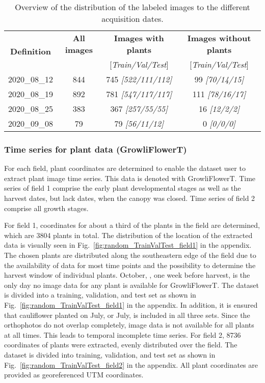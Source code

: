 \documentclass{article}
\def\figref#1{Fig.~\ref{#1}}
\begin{document}
\begin{table}[t]
    \caption{Overview of the distribution of the labeled images to the different acquisition dates.}\label{table:OPTIKOlabeled}
    \begin{center}
    \begin{tabular}{|c|c|c|c|}
        \hline
         \multirow{2}{*}{\textbf{Definition}} &  \textbf{All images} & \textbf{Images with plants} &  \textbf{Images without plants}\\
        &  &  [\textit{Train/Val/Test}]  & [\textit{Train/Val/Test}]\\
        \hline
        2020\_08\_12 & 844 & 745 \textit{[522/111/112]} & 99 \textit{[70/14/15]}\\
        2020\_08\_19 & 892 & 781 \textit{[547/117/117]} & 111 \textit{[78/16/17]}\\
        2020\_08\_25 & 383 & 367 \textit{[257/55/55]} & 16 \textit{[12/2/2]}\\
        2020\_09\_08 & 79 & 79 \textit{[56/11/12]} & 0 \textit{[0/0/0]}\\
        \hline
    \end{tabular}
    \end{center}
\end{table}



\subsubsection{Time series for plant data (GrowliFlowerT)}\label{sec:GrowliFlowerT}

For each field, plant coordinates are determined to enable the dataset user to extract plant image time series.
This data is denoted with GrowliFlowerT. Time series of field 1 comprise the early plant developmental stages as well as the harvest dates, but lack dates, when the canopy was closed. Time series of field 2 comprise all growth stages.

For field 1, coordinates for about a third of the plants in the field are determined, which are 3804 plants in total. The distribution of the location of the extracted data is visually seen in \figref{fig:random_TrainValTest_field1} in the appendix. The chosen plants are distributed along the southeastern edge of the field due to the availability of data for most time points and the possibility to determine the harvest window of individual plants. October, , one week before harvest, is the only day no image data for any plant is available for GrowliFlowerT.
The dataset is divided into a training, validation, and test set as shown in \figref{fig:random_TrainValTest_field1} in the appendix. In addition, it is ensured that cauliflower planted on July,  or July,  is included in all three sets.
Since the orthophotos do not overlap completely, image data is not available for all plants at all times. This leads to temporal incomplete time series. 
%
For field 2, 8736 coordinates of plants were extracted, evenly distributed over the field. The dataset is divided into training, validation, and test set as shown in \figref{fig:random_TrainValTest_field2} in the appendix. All plant coordinates are provided as georeferenced UTM coordinates. 
\end{document}
